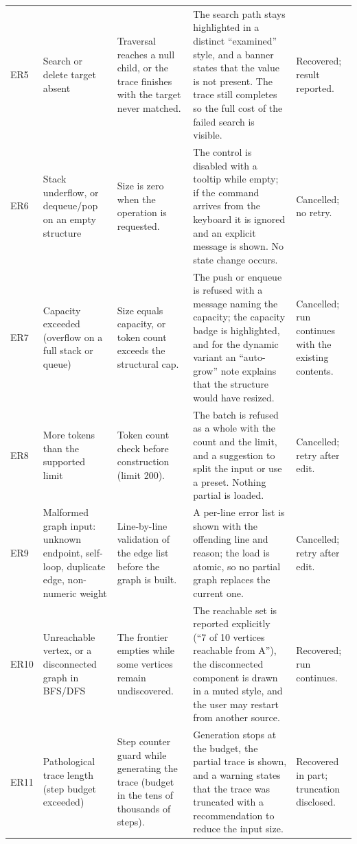 \documentclass[11pt,a4paper]{article}
\begin{document}
{\begin{longtable}{@{}L{0.9cm}L{3.3cm}L{3.0cm}L{5.9cm}L{2.0cm}@{}}
ER5 & Search or delete target absent &
Traversal reaches a null child, or the trace finishes with the target never matched. &
The search path stays highlighted in a distinct ``examined'' style, and a banner states that
the value is not present. The trace still completes so the full cost of the failed search
is visible. &
Recovered; result reported. \\

ER6 & Stack underflow, or dequeue/pop on an empty structure &
Size is zero when the operation is requested. &
The control is disabled with a tooltip while empty; if the command arrives from the keyboard
it is ignored and an explicit message is shown. No state change occurs. &
Cancelled; no retry. \\

ER7 & Capacity exceeded (overflow on a full stack or queue) &
Size equals capacity, or token count exceeds the structural cap. &
The push or enqueue is refused with a message naming the capacity; the capacity badge is
highlighted, and for the dynamic variant an ``auto-grow'' note explains that the structure
would have resized. &
Cancelled; run continues with the existing contents. \\

ER8 & More tokens than the supported limit &
Token count check before construction (limit 200). &
The batch is refused as a whole with the count and the limit, and a suggestion to split the
input or use a preset. Nothing partial is loaded. &
Cancelled; retry after edit. \\

ER9 & Malformed graph input: unknown endpoint, self-loop, duplicate edge, non-numeric
weight &
Line-by-line validation of the edge list before the graph is built. &
A per-line error list is shown with the offending line and reason; the load is atomic, so
no partial graph replaces the current one. &
Cancelled; retry after edit. \\

ER10 & Unreachable vertex, or a disconnected graph in BFS/DFS &
The frontier empties while some vertices remain undiscovered. &
The reachable set is reported explicitly (``7 of 10 vertices reachable from A''), the
disconnected component is drawn in a muted style, and the user may restart from another
source. &
Recovered; run continues. \\

ER11 & Pathological trace length (step budget exceeded) &
Step counter guard while generating the trace (budget in the tens of thousands of steps). &
Generation stops at the budget, the partial trace is shown, and a warning states that the
trace was truncated with a recommendation to reduce the input size. &
Recovered in part; truncation disclosed. \\


\end{longtable}}
\end{document}
